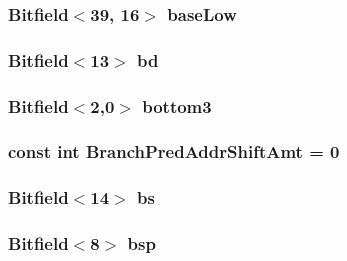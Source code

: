 \hypertarget{namespaceX86ISA_ac643c495e93124579f3889d6ed54ac29}{
\subsubsection[{baseLow}]{\setlength{\rightskip}{0pt plus 5cm}Bitfield$<$39, 16$>$ {\bf baseLow}}}
\label{namespaceX86ISA_ac643c495e93124579f3889d6ed54ac29}
\hypertarget{namespaceX86ISA_a226e6566a8cb9483be35f86053c46482}{
\subsubsection[{bd}]{\setlength{\rightskip}{0pt plus 5cm}Bitfield$<$13$>$ {\bf bd}}}
\label{namespaceX86ISA_a226e6566a8cb9483be35f86053c46482}
\hypertarget{namespaceX86ISA_a6aabe00ec8c89330ec7e272c2145bc87}{
\subsubsection[{bottom3}]{\setlength{\rightskip}{0pt plus 5cm}Bitfield$<$2,0$>$ {\bf bottom3}}}
\label{namespaceX86ISA_a6aabe00ec8c89330ec7e272c2145bc87}
\hypertarget{namespaceX86ISA_a518c446960e93d236b89246eabc20298}{
\subsubsection[{BranchPredAddrShiftAmt}]{\setlength{\rightskip}{0pt plus 5cm}const int {\bf BranchPredAddrShiftAmt} = 0}}
\label{namespaceX86ISA_a518c446960e93d236b89246eabc20298}
\hypertarget{namespaceX86ISA_a6296733516f3f437db9b445ffd81ccc6}{
\subsubsection[{bs}]{\setlength{\rightskip}{0pt plus 5cm}Bitfield$<$14$>$ {\bf bs}}}
\label{namespaceX86ISA_a6296733516f3f437db9b445ffd81ccc6}
\hypertarget{namespaceX86ISA_af18c00627819c09b6425eb397d13a11f}{
\subsubsection[{bsp}]{\setlength{\rightskip}{0pt plus 5cm}Bitfield$<$8$>$ {\bf bsp}}}

